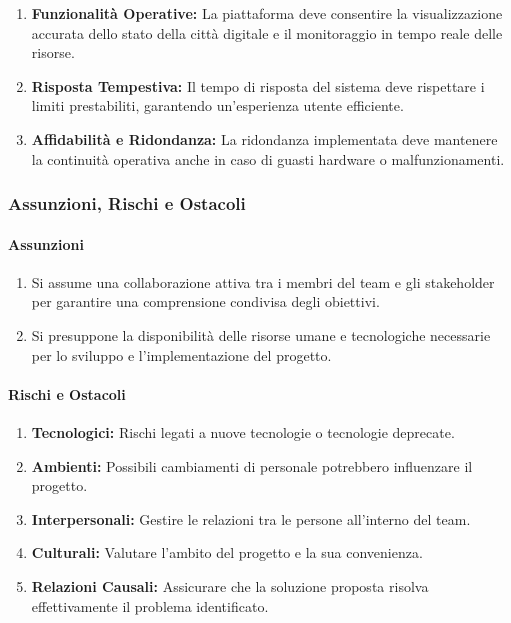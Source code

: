 \begin{enumerate}
  \item \textbf{Funzionalità Operative:} La piattaforma deve consentire la visualizzazione accurata dello stato della città digitale e il monitoraggio in tempo reale delle risorse.
  
  \item \textbf{Risposta Tempestiva:} Il tempo di risposta del sistema deve rispettare i limiti prestabiliti, garantendo un'esperienza utente efficiente.
  
  \item \textbf{Affidabilità e Ridondanza:} La ridondanza implementata deve mantenere la continuità operativa anche in caso di guasti hardware o malfunzionamenti.
\end{enumerate}

\subsubsection{Assunzioni, Rischi e Ostacoli}

\paragraph{Assunzioni}

\begin{enumerate}
  \item Si assume una collaborazione attiva tra i membri del team e gli stakeholder per garantire una comprensione condivisa degli obiettivi.
  
  \item Si presuppone la disponibilità delle risorse umane e tecnologiche necessarie per lo sviluppo e l'implementazione del progetto.
\end{enumerate}

\paragraph{Rischi e Ostacoli}

\begin{enumerate}
  \item \textbf{Tecnologici:} Rischi legati a nuove tecnologie o tecnologie deprecate.
  
  \item \textbf{Ambienti:} Possibili cambiamenti di personale potrebbero influenzare il progetto.
  
  \item \textbf{Interpersonali:} Gestire le relazioni tra le persone all'interno del team.
  
  \item \textbf{Culturali:} Valutare l'ambito del progetto e la sua convenienza.
  
  \item \textbf{Relazioni Causali:} Assicurare che la soluzione proposta risolva effettivamente il problema identificato.
\end{enumerate}

